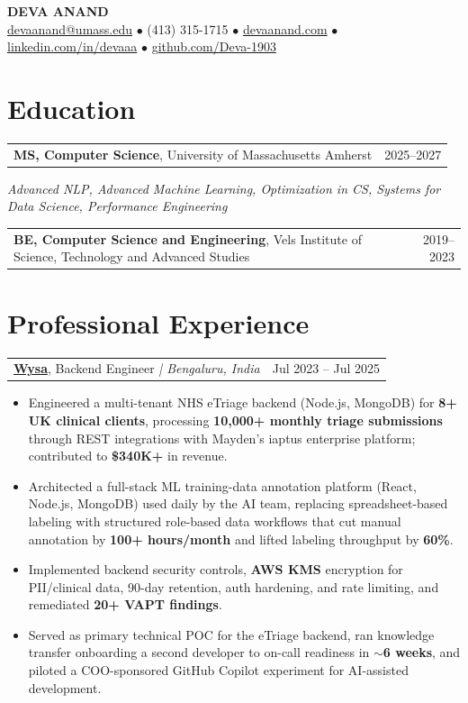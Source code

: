 \documentclass[letterpaper,11pt]{article}
\makeatletter
\newcommand{\eduItem}[3]{%
  \begin{tabular*}{\textwidth}{@{}l@{\extracolsep{\fill}}r@{}}
    \textbf{#1}, #2 & #3 \\
  \end{tabular*}\par
}
\newcommand{\expItem}[4]{%
  \vspace{2pt}
  \begin{tabular*}{\textwidth}{@{}l@{\extracolsep{\fill}}r@{}}
    \textbf{#1}, #2 \textit{| #3} & #4 \\
  \end{tabular*}\par\vspace{-2pt}
}
\makeatother
\begin{document}
\begin{center}
    {\fontsize{18}{20}\selectfont\bfseries DEVA ANAND}\\ \vspace{3pt}
    {\small
    \href{mailto:devaanand@umass.edu}{devaanand@umass.edu}
    \enspace$\bullet$\enspace
    (413) 315-1715
    \enspace$\bullet$\enspace
    \href{https://devaanand.com}{devaanand.com}
    \enspace$\bullet$\enspace
    \href{https://linkedin.com/in/devaaa/}{linkedin.com/in/devaaa}
    \enspace$\bullet$\enspace
    \href{https://github.com/Deva-1903}{github.com/Deva-1903}}
\end{center}
\vspace{-6pt}

\section{Education}
\eduItem{MS, Computer Science}{University of Massachusetts Amherst}{2025--2027}
{\small\textit{Advanced NLP, Advanced Machine Learning, Optimization in CS, Systems for Data Science, Performance Engineering}}\par
\vspace{3pt}
\eduItem{BE, Computer Science and Engineering}{Vels Institute of Science, Technology and Advanced Studies}{2019--2023}

\section{Professional Experience}

\expItem{\href{https://www.wysa.io}{Wysa}}{Backend Engineer}{Bengaluru, India}{Jul 2023 -- Jul 2025}
\begin{itemize}
  \item Engineered a multi-tenant NHS eTriage backend (Node.js, MongoDB) for \textbf{8+ UK clinical clients}, processing \textbf{10{,}000+ monthly triage submissions} through REST integrations with Mayden's iaptus enterprise platform; contributed to \textbf{\$340K+} in revenue.
  \item Architected a full-stack ML training-data annotation platform (React, Node.js, MongoDB) used daily by the AI team, replacing spreadsheet-based labeling with structured role-based data workflows that cut manual annotation by \textbf{100+ hours/month} and lifted labeling throughput by \textbf{60\%}.
  \item Implemented backend security controls, \textbf{AWS KMS} encryption for PII/clinical data, 90-day retention, auth hardening, and rate limiting, and remediated \textbf{20+ VAPT findings}.
  \item Served as primary technical POC for the eTriage backend, ran knowledge transfer onboarding a second developer to on-call readiness in \textbf{$\sim$6 weeks}, and piloted a COO-sponsored GitHub Copilot experiment for AI-assisted development.
\end{itemize}
\end{document}
